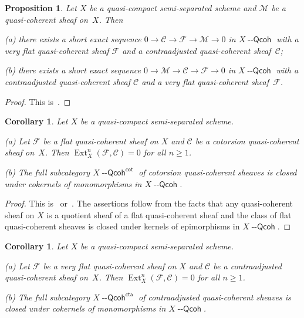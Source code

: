 \documentclass[12pt,a4paper]{amsart}
\newcommand{\+}{\protect\nobreakdash-}
\renewcommand{\:}{\colon}
\newcommand{\rarrow}{\longrightarrow}
\DeclareMathOperator{\Ext}{Ext}
\newcommand{\Qcoh}{{\operatorname{\mathsf{--Qcoh}}}}
\newcommand{\cta}{\mathsf{cta}}
\renewcommand{\cot}{\mathsf{cot}}
\newcommand{\cM}{\mathcal M}
\newcommand{\cF}{\mathcal F}
\newcommand{\cC}{\mathcal C}
\theoremstyle{plain}
\newtheorem{prop}[thm]{Proposition}
\newtheorem{cor}[thm]{Corollary}
\theoremstyle{definition}
\begin{document}
\begin{prop} \label{very-flat-cotorsion-pair-in-qcoh-sheaves}
 Let $X$ be a quasi-compact semi-separated scheme and\/ $\cM$ be
a quasi-coherent sheaf on~$X$.
 Then \par
\textup{(a)} there exists a short exact sequence\/ $0\rarrow\cC\rarrow
\cF\rarrow\cM\rarrow0$ in $X\Qcoh$ with a very flat quasi-coherent
sheaf\/ $\cF$ and a contraadjusted quasi-coherent sheaf\/~$\cC$; \par
\textup{(b)} there exists a short exact sequence\/ $0\rarrow\cM\rarrow
\cC\rarrow\cF\rarrow0$ in $X\Qcoh$ with a contraadjusted quasi-coherent
sheaf\/ $\cC$ and a very flat quasi-coherent sheaf\/~$\cF$.
\end{prop}

\begin{proof}
 This is~\cite[Corollary~4.1.4(a\+-b)]{Pcosh}.
\end{proof}

\begin{cor} \label{cotorsion-qcoh-sheaves-hereditary-cor}
 Let $X$ be a quasi-compact semi-separated scheme. \par
\textup{(a)} Let $\cF$ be a flat quasi-coherent sheaf on $X$ and\/
$\cC$ be a cotorsion quasi-coherent sheaf on~$X$.
 Then\/ $\Ext_X^n(\cF,\cC)=0$ for all $n\ge1$. \par
\textup{(b)} The full subcategory $X\Qcoh^\cot$ of cotorsion
quasi-coherent sheaves is closed under cokernels of monomorphisms
in $X\Qcoh$.
\end{cor}

\begin{proof}
 This is~\cite[Corollary~4.1.9]{Pcosh} or~\cite[Corollary~7.5.6]{Pform}.
 The assertions follow from the facts that any quasi-coherent sheaf
on $X$ is a quotient sheaf of a flat quasi-coherent sheaf and
the class of flat quasi-coherent sheaves is closed under kernels of
epimorphisms in $X\Qcoh$.
\end{proof}

\begin{cor} \label{cta-qcoh-sheaves-hereditary-cor}
 Let $X$ be a quasi-compact semi-separated scheme. \par
\textup{(a)} Let $\cF$ be a very flat quasi-coherent sheaf on $X$ and\/
$\cC$ be a contraadjusted quasi-coherent sheaf on~$X$.
 Then\/ $\Ext_X^n(\cF,\cC)=0$ for all $n\ge1$. \par
\textup{(b)} The full subcategory $X\Qcoh^\cta$ of contraadjusted
quasi-coherent sheaves is closed under cokernels of monomorphisms
in $X\Qcoh$.
\end{cor}
\end{document}

